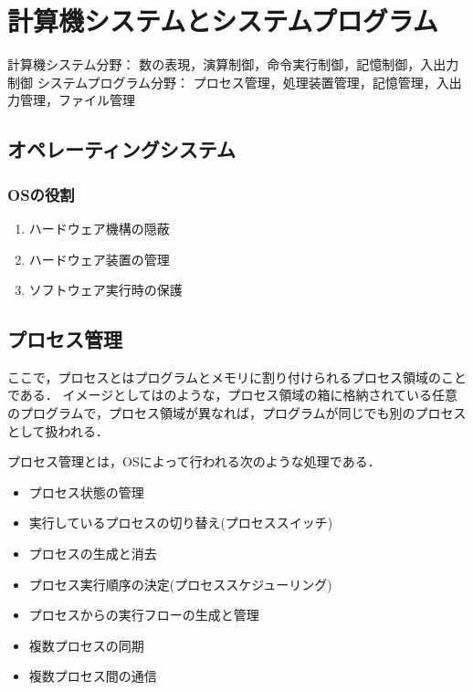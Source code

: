 \chapter{計算機システムとシステムプログラム}
計算機システム分野：
数の表現，演算制御，命令実行制御，記憶制御，入出力制御
システムプログラム分野：
プロセス管理，処理装置管理，記憶管理，入出力管理，ファイル管理

\section{オペレーティングシステム}

\subsection{OSの役割}

\begin{enumerate}
    \item ハードウェア機構の隠蔽
    \item ハードウェア装置の管理
    \item ソフトウェア実行時の保護
\end{enumerate}

\section{プロセス管理}

ここで，プロセスとはプログラムとメモリに割り付けられるプロセス領域のことである．
イメージとしてはのような，プロセス領域の箱に格納されている任意のプログラムで，プロセス領域が異なれば，プログラムが同じでも別のプロセスとして扱われる．


プロセス管理とは，OSによって行われる次のような処理である．

\begin{itemize}
    \item プロセス状態の管理
    \item 実行しているプロセスの切り替え(プロセススイッチ) 
    \item プロセスの生成と消去
    \item プロセス実行順序の決定(プロセススケジューリング)
    \item プロセスからの実行フローの生成と管理
    \item 複数プロセスの同期
    \item 複数プロセス間の通信
\end{itemize}

